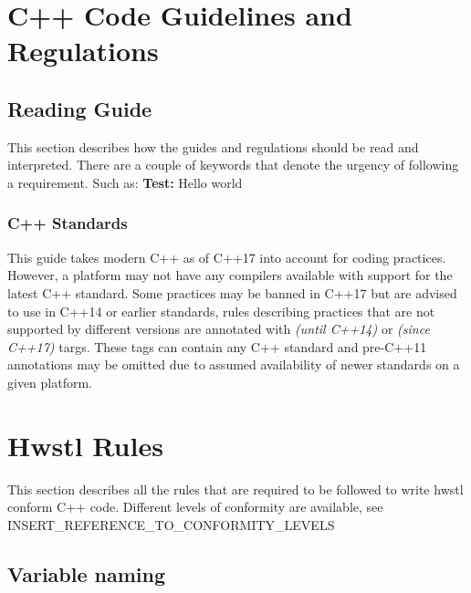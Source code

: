 \documentclass[12pt]{article}
\newcommand{\cppuntil}[1]{\footnotesize\textit{(until C++#1)}\normalsize}
\newcommand{\cppsince}[1]{\footnotesize\textit{(since C++#1)}\normalsize}
\begin{document}
\pagebreak
\section{C++ Code Guidelines and Regulations}
\subsection{Reading Guide}
This section describes how the guides and regulations should be read and
interpreted. There are a couple of keywords that denote the urgency of
following a requirement. Such as:
\bigbreak
\textbf{Test:} Hello world
\subsubsection{C++ Standards}
This guide takes modern C++ as of C++17 into account for coding practices.
However, a platform may not have any compilers available with support for the
latest C++ standard. Some practices may be banned in C++17 but are advised to
use in C++14 or earlier standards, rules describing practices that are not
supported by different versions are annotated with \cppuntil{14} or
\cppsince{17} targs. These tags can contain any C++ standard and pre-C++11
annotations may be omitted due to assumed availability of newer standards on a
given platform.

\pagebreak
\section{Hwstl Rules}
This section describes all the rules that are required to be followed to write
hwstl conform C++ code. Different levels of conformity are available, see
INSERT\_REFERENCE\_TO\_CONFORMITY\_LEVELS

\subsection{Variable naming}
\end{document}
